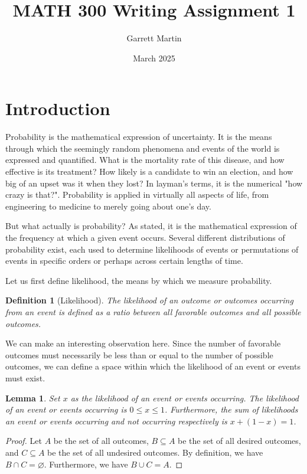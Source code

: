 \documentclass{article}
\title{MATH 300 Writing Assignment 1}
\author{Garrett Martin}
\date{March 2025}
\newtheorem{definition}{Definition}[section]
\newtheorem{lemma}[theorem]{Lemma}
\begin{document}
\maketitle

\section{Introduction}

Probability is the mathematical expression of uncertainty. It is the means through which the seemingly random phenomena and events of the world is expressed and quantified. What is the mortality rate of this disease, and how effective is its treatment? How likely is a candidate to win an election, and how big of an upset was it when they lost? In layman's terms, it is the numerical "how crazy is that?". Probability is applied in virtually all aspects of life, from engineering to medicine to merely going about one's day. 

But what actually is probability? As stated, it is the mathematical expression of the frequency at which a given event occurs. Several different distributions of probability exist, each used to determine likelihoods of events or permutations of events in specific orders or perhaps across certain lengths of time.

Let us first define likelihood, the means by which we measure probability.

\begin{definition}[Likelihood]
The likelihood of an outcome or outcomes occurring from an event is defined as a ratio between all favorable outcomes and all possible outcomes.
\end{definition}

We can make an interesting observation here. Since the number of favorable outcomes must necessarily be less than or equal to the number of possible outcomes, we can define a space within which the likelihood of an event or events must exist.

\begin{lemma}
    Set $x$ as the likelihood of an event or events occurring. The likelihood of an event or events occurring is $0\leq x\leq 1$. Furthermore, the sum of likelihoods an event or events occurring and not occurring respectively is $x+(1-x)=1$.
\end{lemma}

\begin{proof}
    Let $A$ be the set of all outcomes, $B\subseteq A$ be the set of all desired outcomes, and $C\subseteq A$ be the set of all undesired outcomes. By definition, we have $B\cap C=\varnothing$. Furthermore, we have $B\cup C=A$. 
\end{proof}
\end{document}
